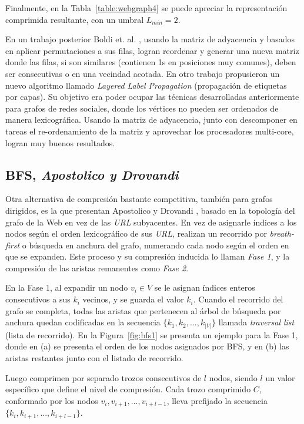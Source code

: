 Finalmente, en la Tabla~\ref{table:webgraph4} se puede apreciar la representación comprimida resultante, con un umbral $L_{min} = 2$. 

En un trabajo posterior Boldi et. al. \cite{boldi2009permuting}, usando la matriz de adyacencia y basados en aplicar permutaciones a sus filas, logran reordenar y generar una nueva matriz donde las filas, si son similares (contienen 1s en posiciones muy comunes), deben ser consecutivas o en una vecindad acotada. En otro trabajo propusieron un nuevo algoritmo llamado \textit{Layered Label Propagation} \cite{boldi2011layered} (propagación de etiquetas por capas). Su objetivo era poder ocupar las técnicas desarrolladas anteriormente para grafos de redes sociales, donde los vértices no pueden ser ordenados de manera lexicográfica. Usando la matriz de adyacencia, junto con descomponer en tareas el re-ordenamiento de la matriz y aprovechar los procesadores multi-core, logran muy buenos resultados.


\subsection{BFS, \textit{Apostolico y Drovandi}}
Otra alternativa de compresión bastante competitiva, también para grafos dirigidos, es la que presentan Apostolico y Drovandi \cite{apostolico2009graph}, basado en la topología del grafo de la Web en vez de las \textit{URL} subyacentes. En vez de asignarle índices a los nodos según el orden lexicográfico de sus \textit{URL}, realizan un recorrido por \textit{breath-first} o búsqueda en anchura del grafo, numerando cada nodo según el orden en que se expanden. Este proceso y su compresión inducida lo llaman \textit{Fase 1}, y la compresión de las aristas remanentes como \textit{Fase 2}.

En la Fase 1, al expandir un nodo $v_{i} \in V$ se le asignan índices enteros consecutivos a sus $k_{i}$ vecinos, y se guarda el valor $k_{i}$. Cuando el recorrido del grafo se completa, todas las aristas que pertenecen al árbol de búsqueda por anchura quedan codificadas en la secuencia $\{k_{1}, k_{2}, ..., k_{|V|}\}$ llamada \textit{traversal list} (lista de recorrido). En la Figura~\ref{fig:bfs1} se presenta un ejemplo para la Fase 1, donde en (a) se presenta el orden de los nodos asignados por BFS, y en (b) las aristas restantes junto con el listado de recorrido.



Luego comprimen por separado trozos consecutivos de $l$ nodos, siendo $l$ un valor específico que define el nivel de compresión. Cada trozo comprimido $C$, conformado por los nodos $v_{i}, v_{i + 1}, ..., v_{i + l - 1}$, lleva prefijado la secuencia $\{k_{i}, k_{i + 1}, ..., k_{i + l - 1}\}$.

